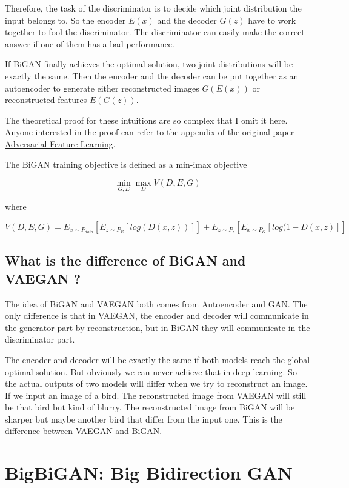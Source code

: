 \documentclass{article} %
\begin{document}
Therefore, the task of the discriminator is to decide which joint distribution the input belongs to. So the encoder $E(x)$ and the decoder $G(z)$ have to work together to fool the discriminator. The discriminator can easily make the correct answer if one of them has a bad performance.

If BiGAN finally achieves the optimal solution, two joint distributions will be exactly the same. Then the encoder and the decoder can be put together as an autoencoder to generate either reconstructed images $G(E(x))$ or reconstructed features $E(G(z))$.

The theoretical proof for these intuitions are so complex that I omit it here. Anyone interested in the proof can refer to the appendix of the original paper \href{https://arxiv.org/abs/1605.09782}{Adversarial Feature Learning}.

The BiGAN training objective is defined as a min-imax objective

\begin{equation}
    \min_{G,E} \max_{D} V(D,E,G)
\end{equation}

where

\begin{equation}
    V(D,E,G)=E_{x \sim P_{data}}[E_{z \sim P_E}[log(D(x, z))]]+E_{z \sim P_z}[E_{x \sim P_G}[log(1-D(x,z)]]
\end{equation}

\subsection{What is the difference of BiGAN and VAEGAN ?}

The idea of BiGAN and VAEGAN both comes from Autoencoder and GAN. The only difference is that in VAEGAN, the encoder and decoder will communicate in the generator part by reconstruction, but in BiGAN they will communicate in the discriminator part.

The encoder and decoder will be exactly the same if both models reach the global optimal solution. But obviously we can never achieve that in deep learning. So the actual outputs of two models will differ when we try to reconstruct an image. If we input an image of a bird. The reconstructed image from VAEGAN will still be that bird but kind of blurry. The reconstructed image from BiGAN will be sharper but maybe another bird that differ from the input one. This is the difference between VAEGAN and BiGAN.

\section{BigBiGAN: Big Bidirection GAN}
\end{document}
